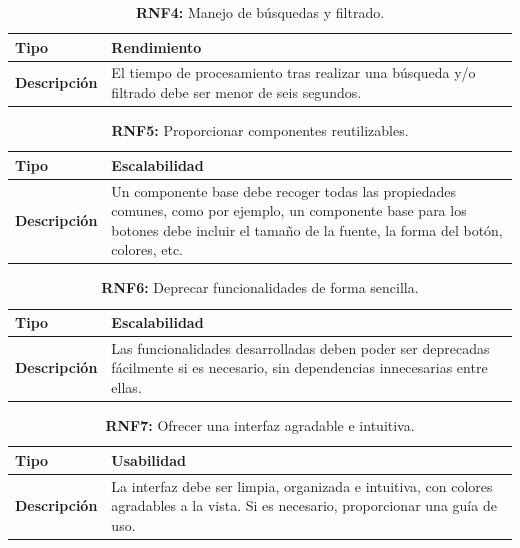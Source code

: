 \documentclass[a4paper, 12pt]{article}
\begin{document}
\begin{table}[H]
\captionsetup{list=no}%
\captionsetup{justification=raggedright,singlelinecheck=false}
\captionsetup{labelformat=empty}
\caption{\textbf{RNF4:} Manejo de búsquedas y filtrado.}
\label{tab:RNF4}
    \begin{tabular}{|m{5cm}|m{10cm}|}
	    \hline
	    \textbf{Tipo} & Rendimiento \\ 
	    \hline
	    \textbf{Descripción} & El tiempo de procesamiento tras realizar una búsqueda y/o filtrado debe ser menor de seis segundos. \\ 
	    \hline
    \end{tabular}
\end{table}

\begin{table}[H]
\captionsetup{list=no}%
\captionsetup{justification=raggedright,singlelinecheck=false}
\captionsetup{labelformat=empty}
\caption{\textbf{RNF5:} Proporcionar componentes reutilizables.}
\label{tab:RNF5}
    \begin{tabular}{|m{5cm}|m{10cm}|}
	    \hline
	    \textbf{Tipo} & Escalabilidad \\ 
	    \hline
	    \textbf{Descripción} & Un componente base debe recoger todas las propiedades comunes, como por ejemplo, un componente base para los botones debe incluir el tamaño de la fuente, la forma del botón, colores, etc. \\ 
	    \hline
    \end{tabular}
\end{table}

\begin{table}[H]
\captionsetup{list=no}%
\captionsetup{justification=raggedright,singlelinecheck=false}
\captionsetup{labelformat=empty}
\caption{\textbf{RNF6:} Deprecar funcionalidades de forma sencilla.}
\label{tab:RNF6}
    \begin{tabular}{|m{5cm}|m{10cm}|}
	    \hline
	    \textbf{Tipo} & Escalabilidad \\ 
	    \hline
	    \textbf{Descripción} & Las funcionalidades desarrolladas deben poder ser deprecadas fácilmente si es necesario, sin dependencias innecesarias entre ellas. \\ 
	    \hline
    \end{tabular}
\end{table}

\begin{table}[H]
\captionsetup{list=no}%
\captionsetup{justification=raggedright,singlelinecheck=false}
\captionsetup{labelformat=empty}
\caption{\textbf{RNF7:} Ofrecer una interfaz agradable e intuitiva. }
\label{tab:RNF7}
    \begin{tabular}{|m{5cm}|m{10cm}|}
	    \hline
	    \textbf{Tipo} & Usabilidad \\ 
	    \hline
	    \textbf{Descripción} & La interfaz debe ser limpia, organizada e intuitiva, con colores agradables a la vista. Si es necesario, proporcionar una guía de uso. \\ 
	    \hline
    \end{tabular}
\end{table}
\end{document}
